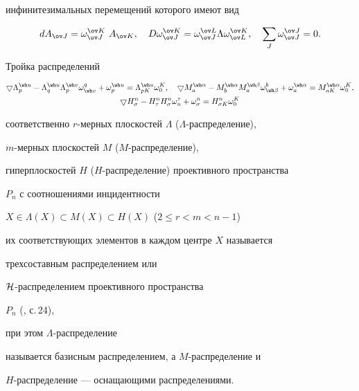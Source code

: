 инфинитезимальных перемещений которого имеют вид


$$


dA_{\ov J}=\omega^{\ov K}_{\ov J}\ A_{\ov K},\quad


D\omega^{\ov K}_{\ov J}=\omega^{\ov L}_{\ov J}


\Lambda \omega^{\ov K}_{\ov L},\quad


\sum\limits_J \omega^{\ov J}_{\ov J}=0.


$$





\begin{defnnonum}


Тройка распределений


\begin{gather*}


\bgd\Lambda^{\wh u}_p-\Lambda^{\wh u}_q


\Lambda^{\wh v}_p \omega^q_{\wh v}+\omega^{\wh u}_p=


\Lambda^{\wh u}_{pK} \omega^K_0,\quad


\bgd M^{\wh \alpha}_a-M^{\wh \alpha}_b


M^{\wh \beta}_a \omega^b_{\wh \beta}+\omega^{\wh \alpha}_a=


M^{\wh \alpha}_{aK} \omega^K_0, \\


\bgd H^n_\sigma-H^n_\tau


H^n_\sigma \omega^\tau_n+\omega^n_\sigma=


H^n_{\sigma K} \omega^K_0


\end{gather*}


соответственно $r$-мерных плоскостей $\Lambda$ ($\Lambda$-распределение),


$m$-мерных плоскостей $M$ ($M$-рас\-пре\-де\-ле\-ние),


гиперплоскостей $H$ ($H$-распределение) проективного пространства


$P_n$ с соотношениями инцидентности


$X\in \Lambda(X)\subset M(X)\subset H(X)$ ($2\le r<m<n-1$)


их соответствующих элементов в каждом центре $X$ называется


трехсоставным распределением или


$\cal H$-распределением проективного пространства


$P_n$ (\cite{rab1}, с.\,24),


при этом $\Lambda$-распределение


называется базисным распределением, а $M$-распределение и


$H$-распределение --- оснащающими распределениями.


\end{defnnonum}





